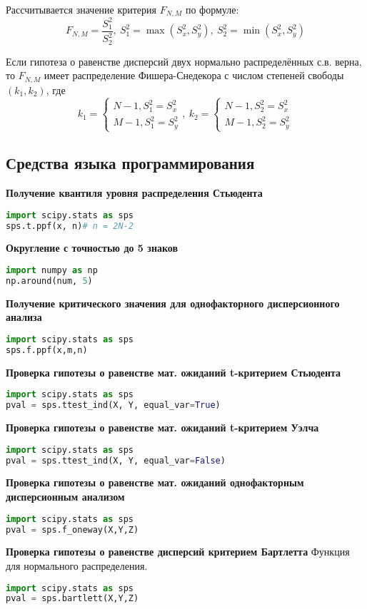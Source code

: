 Рассчитывается значение критерия $F_{N,M}$ по формуле:
$$
F_{N,M} = \frac{S_1^2}{S_2^2}, \: S_1^2 = \max{\left(S_x^2, S_y^2\right)}, \: S_2^2 = \min{\left(S_x^2, S_y^2\right)}
$$

Если гипотеза о равенстве дисперсий двух нормально распределённых с.в. верна, то $F_{N,M}$ имеет распределение Фишера-Снедекора с числом степеней свободы $(k_1, k_2)$, где
$$
k_1 = \begin{cases}
N-1, S_1^2 = S_x^2\\
M-1, S_1^2 = S_y^2
\end{cases}, \:
k_2 = \begin{cases}
N-1, S_2^2 = S_x^2\\
M-1, S_2^2 = S_y^2
\end{cases}
$$

\subsection{Средства языка программирования}%
\textbf{Получение квантиля уровня распределения Стьюдента}
\begin{lstlisting}[language=Python]
import scipy.stats as sps
sps.t.ppf(x, n)# n = 2N-2
\end{lstlisting}

\textbf{Округление с точностью до 5 знаков}
\begin{lstlisting}[language=Python]
import numpy as np
np.around(num, 5)
\end{lstlisting}

\textbf{Получение критического значения для однофакторного дисперсионного анализа}
\begin{lstlisting}[language=Python]
import scipy.stats as sps
sps.f.ppf(x,m,n) 
\end{lstlisting}

\textbf{Проверка гипотезы о равенстве мат. ожиданий t-критерием Стьюдента}
\begin{lstlisting}[language=Python]
import scipy.stats as sps
pval = sps.ttest_ind(X, Y, equal_var=True)
\end{lstlisting}

\textbf{Проверка гипотезы о равенстве мат. ожиданий t-критерием Уэлча}
\begin{lstlisting}[language=Python]
import scipy.stats as sps
pval = sps.ttest_ind(X, Y, equal_var=False)
\end{lstlisting}

\textbf{Проверка гипотезы о равенстве мат. ожиданий однофакторным дисперсионным анализом}
\begin{lstlisting}[language=Python]
import scipy.stats as sps
pval = sps.f_oneway(X,Y,Z)
\end{lstlisting}

\textbf{Проверка гипотезы о равенстве дисперсий критерием Бартлетта}
Функция для нормального распределения.
\begin{lstlisting}[language=Python]
import scipy.stats as sps
pval = sps.bartlett(X,Y,Z)
\end{lstlisting}
